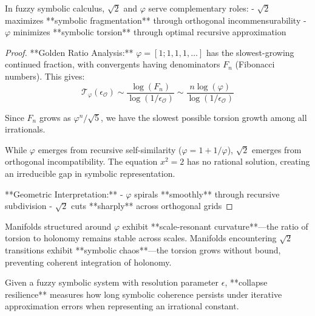 \begin{proposition}
\label{prop:bk5_complementary_constants}
In fuzzy symbolic calculus, $\sqrt{2}$ and $\varphi$ serve complementary roles:
- $\sqrt{2}$ maximizes **symbolic fragmentation** through orthogonal incommensurability
- $\varphi$ minimizes **symbolic torsion** through optimal recursive approximation
\end{proposition}

\begin{proof}
\label{proof:bk5_complementary_constants}
**Golden Ratio Analysis:**
$\varphi = [1; 1, 1, 1, \ldots]$ has the slowest-growing continued fraction, with convergents having denominators $F_n$ (Fibonacci numbers). This gives:
$$\mathcal{T}_{\varphi}(\epsilon_\mathcal{O}) \sim \frac{\log(F_n)}{\log(1/\epsilon_\mathcal{O})} \sim \frac{n\log(\varphi)}{\log(1/\epsilon_\mathcal{O})}$$

Since $F_n$ grows as $\varphi^n/\sqrt{5}$, we have the slowest possible torsion growth among all irrationals.

While $\varphi$ emerges from recursive self-similarity ($\varphi = 1 + 1/\varphi$), $\sqrt{2}$ emerges from orthogonal incompatibility. The equation $x^2 = 2$ has no rational solution, creating an irreducible gap in symbolic representation.

**Geometric Interpretation:**
- $\varphi$ spirals **smoothly** through recursive subdivision
- $\sqrt{2}$ cuts **sharply** across orthogonal grids
\end{proof}

\begin{remark}
\label{remark:bk5_curvature_vs_chaos}
Manifolds structured around $\varphi$ exhibit **scale-resonant curvature**—the ratio of torsion to holonomy remains stable across scales. Manifolds encountering $\sqrt{2}$ transitions exhibit **symbolic chaos**—the torsion grows without bound, preventing coherent integration of holonomy.
\end{remark}

\begin{definition}
\label{def:bk5_collapse_resilience_test}
Given a fuzzy symbolic system with resolution parameter $\epsilon$, **collapse resilience** measures how long symbolic coherence persists under iterative approximation errors when representing an irrational constant.
\end{definition}


